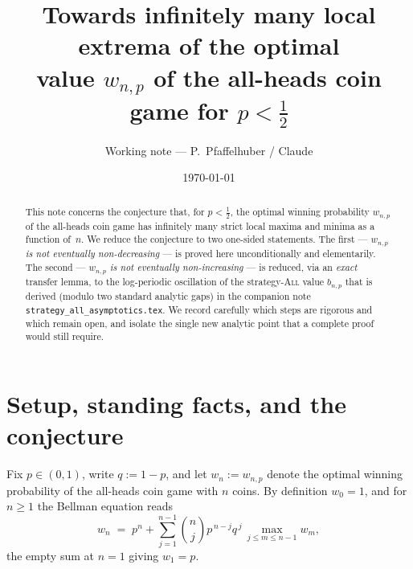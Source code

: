 \documentclass[11pt]{article}
\title{Towards infinitely many local extrema of the optimal\\
  value $w_{n,p}$ of the all-heads coin game for $p<\tfrac12$}
\author{Working note --- P.\ Pfaffelhuber / Claude}
\date{\today}
\theoremstyle{definition}
\newcommand{\All}{\textsc{All}}
\begin{document}
\maketitle

\begin{center}
\end{center}
\bigskip

\begin{abstract}
  This note concerns the conjecture that, for $p<\tfrac12$, the optimal
  winning probability $w_{n,p}$ of the all-heads coin game has
  infinitely many strict local maxima and minima as a function
  of~$n$. We reduce the conjecture to two one-sided statements.
  The first --- \emph{$w_{n,p}$ is not eventually non-decreasing} ---
  is proved here unconditionally and elementarily. The second ---
  \emph{$w_{n,p}$ is not eventually non-increasing} --- is reduced, via
  an \emph{exact} transfer lemma, to the log-periodic oscillation of
  the strategy-\All{} value $b_{n,p}$ that is derived (modulo two
  standard analytic gaps) in the companion note
  \texttt{strategy\_all\_asymptotics.tex}. We record carefully which
  steps are rigorous and which remain open, and isolate the single new
  analytic point that a complete proof would still require.
\end{abstract}

\section{Setup, standing facts, and the conjecture}\label{sec:setup}

Fix $p\in(0,1)$, write $q:=1-p$, and let $w_n:=w_{n,p}$ denote the
optimal winning probability of the all-heads coin game with $n$ coins.
By definition $w_0=1$, and for $n\ge 1$ the Bellman equation reads
\begin{equation}\label{eq:bellman}
  w_n \;=\; p^n + \sum_{j=1}^{n-1}\binom{n}{j}p^{\,n-j}q^{\,j}\,
  \max_{j\le m\le n-1} w_m ,
\end{equation}
the empty sum at $n=1$ giving $w_1=p$.
\end{document}
